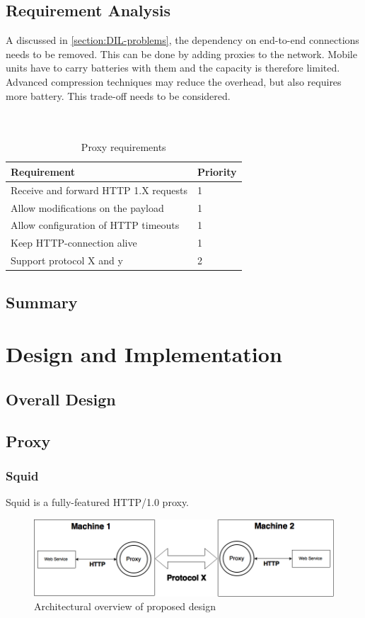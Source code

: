 \documentclass[USenglish]{ifimaster}
\begin{document}
\section{Requirement Analysis}
A discussed in \cref{section:DIL-problems}, the dependency on end-to-end connections needs to be removed. This can be done by adding proxies to the network.
Mobile units have to carry batteries with them and the capacity is therefore limited. Advanced compression techniques may reduce the overhead, but also requires more battery. This trade-off needs to be considered.
\\ \\ \\
\begin{table}[h]
\begin{tabular}{| l | l |}
\hline
  \textbf{Requirement} & \textbf{Priority} \\ \hline
  Receive and forward HTTP 1.X requests & 1\\ \hline
  Allow modifications on the payload & 1 \\ \hline
  Allow configuration of HTTP timeouts & 1 \\ \hline
  Keep HTTP-connection alive & 1 \\ \hline
  Support protocol X and y & 2 \\ \hline
\end{tabular}
\caption{Proxy requirements}
\end{table}

\section{Summary}



\chapter{Design and Implementation}
\section{Overall Design}
\section{Proxy}
\subsection{Squid}
Squid is a fully-featured HTTP/1.0 proxy.
\begin{figure}[h]
\includegraphics[scale=0.4]{images/architecture.png}
\caption{Architectural overview of proposed design}
\end{figure}
\end{document}
